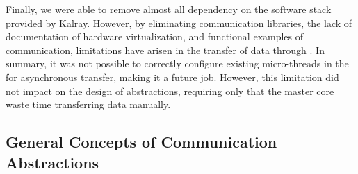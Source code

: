 			Finally, we were able to remove almost all dependency on the software stack provided by Kalray. However, by eliminating communication libraries, the lack of documentation of hardware virtualization, and functional examples of communication, limitations have arisen in the transfer of data through \dnoc. In summary, it was not possible to correctly configure existing micro-threads in the \dma for asynchronous transfer, making it a future job. However, this limitation did not impact on the design of abstractions, requiring only that the master core waste time transferring data manually.

		\subsection{General Concepts of Communication Abstractions}
		\label{sec.general-concepts}



